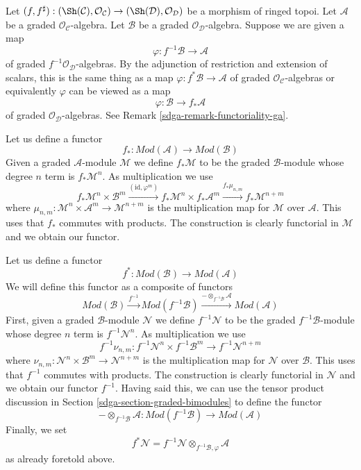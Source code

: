 \medskip\noindent
Let $(f, f^\sharp) : (\Sh(\mathcal{C}), \mathcal{O}_\mathcal{C})
\to (\Sh(\mathcal{D}), \mathcal{O}_\mathcal{D})$
be a morphism of ringed topoi. Let $\mathcal{A}$ be a
graded $\mathcal{O}_\mathcal{C}$-algebra. Let $\mathcal{B}$ be a
graded $\mathcal{O}_\mathcal{D}$-algebra.
Suppose we are given a map
$$
\varphi : f^{-1}\mathcal{B} \to \mathcal{A}
$$
of graded $f^{-1}\mathcal{O}_\mathcal{D}$-algebras.
By the adjunction of restriction and extension of scalars, this
is the same thing as a map $\varphi : f^*\mathcal{B} \to \mathcal{A}$
of graded $\mathcal{O}_\mathcal{C}$-algebras or equivalently
$\varphi$ can be viewed as a map
$$
\varphi : \mathcal{B} \to f_*\mathcal{A}
$$
of graded $\mathcal{O}_\mathcal{D}$-algebras.
See Remark \ref{sdga-remark-functoriality-ga}.

\medskip\noindent
Let us define a functor
$$
f_* :
\textit{Mod}(\mathcal{A})
\longrightarrow
\textit{Mod}(\mathcal{B})
$$
Given a graded $\mathcal{A}$-module $\mathcal{M}$ we define
$f_*\mathcal{M}$ to be the graded $\mathcal{B}$-module
whose degree $n$ term is $f_*\mathcal{M}^n$. As multiplication
we use
$$
f_*\mathcal{M}^n \times \mathcal{B}^m
\xrightarrow{(\text{id}, \varphi^m)}
f_*\mathcal{M}^n \times f_*\mathcal{A}^m
\xrightarrow{f_*\mu_{n, m}}
f_*\mathcal{M}^{n + m}
$$
where $\mu_{n, m} : \mathcal{M}^n \times \mathcal{A}^m
\to \mathcal{M}^{n + m}$ is the multiplication map for $\mathcal{M}$
over $\mathcal{A}$. This uses that $f_*$ commutes with products.
The construction is clearly functorial in
$\mathcal{M}$ and we obtain our functor.

\medskip\noindent
Let us define a functor
$$
f^* :
\textit{Mod}(\mathcal{B})
\longrightarrow
\textit{Mod}(\mathcal{A})
$$
We will define this functor as a composite of functors
$$
\textit{Mod}(\mathcal{B})
\xrightarrow{f^{-1}}
\textit{Mod}(f^{-1}\mathcal{B})
\xrightarrow{ - \otimes_{f^{-1}\mathcal{B}} \mathcal{A}}
\textit{Mod}(\mathcal{A})
$$
First, given a graded $\mathcal{B}$-module $\mathcal{N}$ we define
$f^{-1}\mathcal{N}$ to be the graded $f^{-1}\mathcal{B}$-module
whose degree $n$ term is $f^{-1}\mathcal{N}^n$. As multiplication
we use
$$
f^{-1}\nu_{n, m} :
f^{-1}\mathcal{N}^n \times f^{-1}\mathcal{B}^m
\longrightarrow
f^{-1}\mathcal{N}^{n + m}
$$
where $\nu_{n, m} : \mathcal{N}^n \times \mathcal{B}^m
\to \mathcal{N}^{n + m}$ is the multiplication map for $\mathcal{N}$
over $\mathcal{B}$. This uses that $f^{-1}$ commutes with products.
The construction is clearly functorial in
$\mathcal{N}$ and we obtain our functor $f^{-1}$.
Having said this, we can use the tensor
product discussion in Section \ref{sdga-section-graded-bimodules}
to define the functor
$$
- \otimes_{f^{-1}\mathcal{B}} \mathcal{A} :
\textit{Mod}(f^{-1}\mathcal{B})
\longrightarrow
\textit{Mod}(\mathcal{A})
$$
Finally, we set
$$
f^*\mathcal{N} =
f^{-1}\mathcal{N} \otimes_{f^{-1}\mathcal{B}, \varphi} \mathcal{A}
$$
as already foretold above.

